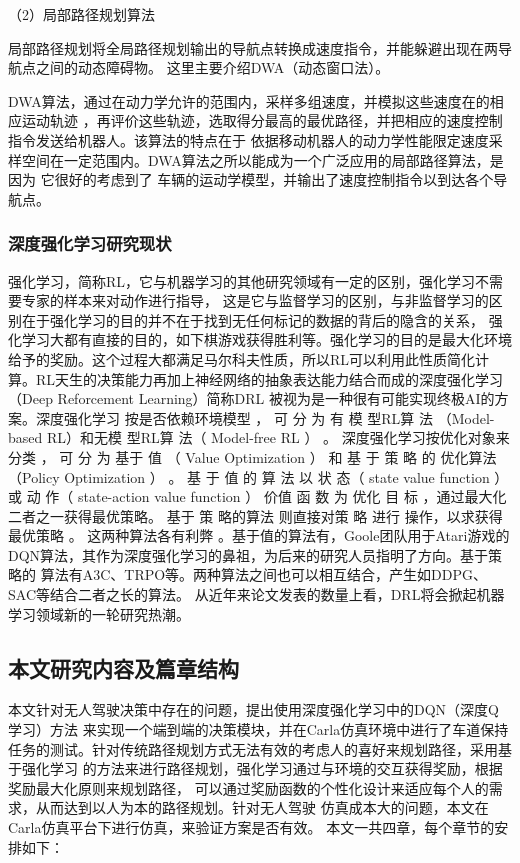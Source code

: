 （2）局部路径规划算法

局部路径规划将全局路径规划输出的导航点转换成速度指令，并能躲避出现在两导航点之间的动态障碍物。
这里主要介绍DWA（动态窗口法）。

DWA算法，通过在动力学允许的范围内，采样多组速度，并模拟这些速度在的相应运动轨迹
，再评价这些轨迹，选取得分最高的最优路径，并把相应的速度控制指令发送给机器人。该算法的特点在于
依据移动机器人的动力学性能限定速度采样空间在一定范围内。DWA算法之所以能成为一个广泛应用的局部路径算法，是因为
它很好的考虑到了
车辆的运动学模型，并输出了速度控制指令以到达各个导航点。

\subsubsection{深度强化学习研究现状}
强化学习，简称RL，它与机器学习的其他研究领域有一定的区别，强化学习不需要专家的样本来对动作进行指导，
这是它与监督学习的区别，与非监督学习的区别在于强化学习的目的并不在于找到无任何标记的数据的背后的隐含的关系，
强化学习大都有直接的目的，如下棋游戏获得胜利等。强化学习的目的是最大化环境给予的奖励。这个过程大都满足马尔科夫性质，所以RL可以利用此性质简化计算。RL天生的决策能力再加上神经网络的抽象表达能力结合而成的深度强化学习（Deep Reforcement Learning）简称DRL
被视为是一种很有可能实现终极AI的方案。深度强化学习
按是否依赖环境模型
， 可 分 为 有 模 型RL算 法
（Model-based RL）和无模 型RL算 法（
Model-free RL ）
。 深度强化学习按优化对象来 分类 ， 可
分 为 基于 值 （ Value Optimization ） 和 基 于 策 略 的 优化算法
（Policy Optimization ）
。 基 于 值 的  算 法 以 状 态（
state value function ）或 动 作（
state-action value function ）  价值 函 数  为 优化 目 标 ，通过最大化二者之一获得最优策略。 基于 策 略的算法 则直接对策 略 进行
操作，以求获得最优策略 。 这两种算法各有利弊
。基于值的算法有，Goole团队用于Atari游戏的DQN算法，其作为深度强化学习的鼻祖，为后来的研究人员指明了方向。基于策略的
算法有A3C、TRPO等。两种算法之间也可以相互结合，产生如DDPG、SAC等结合二者之长的算法。
从近年来论文发表的数量上看，DRL将会掀起机器学习领域新的一轮研究热潮。

\subsection{本文研究内容及篇章结构}
本文针对无人驾驶决策中存在的问题，提出使用深度强化学习中的DQN（深度Q学习）方法
来实现一个端到端的决策模块，并在Carla仿真环境中进行了车道保持任务的测试。针对传统路径规划方式无法有效的考虑人的喜好来规划路径，采用基于强化学习
的方法来进行路径规划，强化学习通过与环境的交互获得奖励，根据奖励最大化原则来规划路径，
可以通过奖励函数的个性化设计来适应每个人的需求，从而达到以人为本的路径规划。针对无人驾驶
仿真成本大的问题，本文在Carla仿真平台下进行仿真，来验证方案是否有效。
本文一共四章，每个章节的安排如下：

